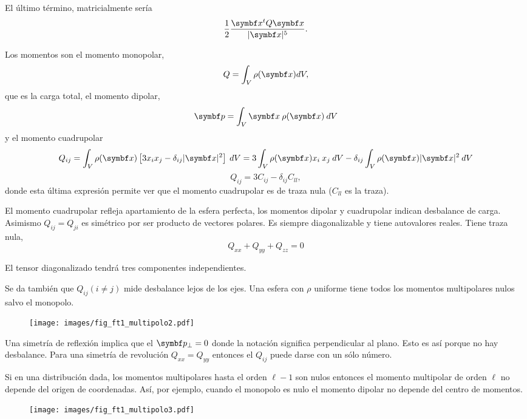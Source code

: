 \documentclass[10pt,oneside]{CBFT_book}
\begin{document}
El último término, matricialmente sería
\[
	\frac{1}{2} \frac{\vb{x}^t Q \vb{x}}{|\vb{x}|^5}.
\]

Los momentos son el momento monopolar,
\[
	Q = \int_V \rho(\vb{x}) dV, 
\]
que es la carga total, el momento dipolar,
\[
	\vb{p} = \int_V \vb{x} \: \rho(\vb{x}) \: dV
\]
y el momento cuadrupolar
\[
	Q_{ij} = \int_V  \rho(\vb{x}) \left[ 3 x_i x_j - \delta_{ij} |\vb{x}|^2 \right] \: dV
	= 3 \int_V  \rho(\vb{x}) x_i \: x_j  \: dV - \delta_{ij} \int_V  \rho(\vb{x})  |\vb{x}|^2  \: dV
\]
\[
	Q_{ij} = 3 C_{ij} - \delta_{ij} C_{ll},
\]
donde esta última expresión permite ver que el momento cuadrupolar es de traza nula ($C_{ll}$ es la traza).

El momento cuadrupolar refleja apartamiento de la esfera perfecta, los momentos dipolar y cuadrupolar
indican desbalance de carga.
Asimismo $Q_{ij} = Q_{ji}$ es simétrico por ser producto de vectores polares.
Es siempre diagonalizable y tiene autovalores reales. 
Tiene traza nula,
\[
	Q_{xx} + Q_{yy} + Q_{zz}  = 0
\]

El tensor diagonalizado tendrá tres componentes independientes.


Se da también que $Q_{ij} (i\neq j)$ mide desbalance lejos de los ejes.
Una esfera con $\rho$ uniforme tiene todos los momentos multipolares nulos salvo el monopolo.

\begin{figure}[htb]
	\begin{center}
	\texttt{[image: images/fig\_ft1\_multipolo2.pdf]}	 
	\end{center}
	\caption{}
\end{figure}

Una simetría de reflexión implica que el $\vb{p}_\perp = 0$ donde la notación significa perpendicular
al plano. Esto es así porque no hay desbalance. Para una simetría de revolución $Q_{xx}=Q_{yy}$ entonces
el $Q_{ij}$ puede darse con un sólo número.

Si en una distribución dada, los momentos multipolares hasta el orden $\ell -1$ son nulos entonces
el momento multipolar de orden $\ell$ no depende del origen de coordenadas.
Así, por ejemplo, cuando el monopolo es nulo el momento dipolar no depende del centro de momentos.

\begin{figure}[htb]
	\begin{center}
	\texttt{[image: images/fig\_ft1\_multipolo3.pdf]}	 
	\end{center}
	\caption{}
\end{figure}
\end{document}

